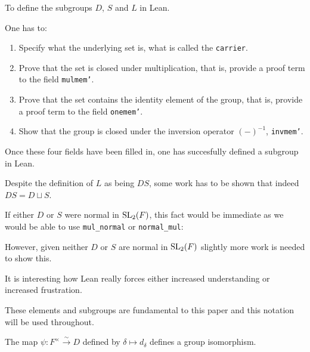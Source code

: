 \begin{remark}
    To define the subgroups $D$, $S$ and $L$ in Lean. 
    
    One has to:
    
    \begin{enumerate}
        \item Specify what the underlying set is, what is called the \texttt{carrier}.
        \item Prove that the set is closed under multiplication, that is, provide a proof term to the field \texttt{mul\textunderscore mem'}.
        \item Prove that the set contains the identity element of the group, that is, provide a proof term to the field \texttt{one\textunderscore mem'}.
        \item Show that the group is closed under the inversion operator $(-)^{-1}$, \texttt{inv\textunderscore mem'}.
    \end{enumerate}

    Once these four fields have been filled in, one has succesfully defined a subgroup in Lean.
\end{remark}


\begin{remark}
    Despite the definition of $L$ as being $D S$, some work has to be shown that indeed $DS = D \sqcup S$.
    
    If either $D$ or $S$ were normal in $\operatorname{SL}_2(F)$, this fact would be immediate as we would be able to use \texttt{mul\_normal} or \texttt{normal\_mul}:
    

    However, given neither $D$ or $S$ are normal in $\operatorname{SL}_2(F)$ slightly more work is needed to show this.
    
    It is interesting how Lean really forces either increased understanding or increased frustration.
\end{remark}

These elements and subgroups are fundamental to this paper and this notation will be used throughout.

\begin{definition}
\label{SpecialSubgroups.D_iso_units}
\leanok
The map $\psi : F^\times \overset{\sim}{\rightarrow} D$ defined by $\delta \mapsto d_\delta$ defines a group isomorphism.
\end{definition}

